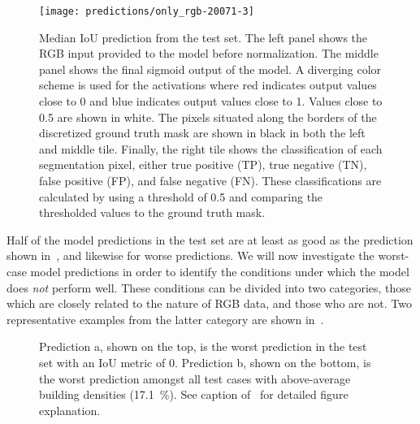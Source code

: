 \begin{figure}[H]
  \centering
  \texttt{[image: predictions/only\_rgb-20071-3]}  %
  \caption{%
    Median IoU prediction from the test set.
    The left panel shows the RGB input provided to the model before normalization.
    The middle panel shows the final sigmoid output of the model.
    A diverging color scheme is used for the activations where red indicates output values close to \num{0} and blue indicates output values close to \num{1}.
    Values close to \num{0.5} are shown in white.
    The pixels situated along the borders of the discretized ground truth mask are shown in black in both the left and middle tile.
    Finally, the right tile shows the classification of each segmentation pixel, either true positive (TP), true negative (TN), false positive (FP), and false negative (FN).
    These classifications are calculated by using a threshold of \num{0.5} and comparing the thresholded values to the ground truth mask.
  }%
  \label{fig:rgb-median-prediction}\label{fig:rgb-explanation}
\end{figure}

Half of the model predictions in the test set are at least as good as the prediction shown in~, and likewise for worse predictions.
We will now investigate the worst-case model predictions in order to identify the conditions under which the model does \emph{not} perform well.
These conditions can be divided into two categories, those which are closely related to the nature of RGB data, and those who are not.
Two representative examples from the latter category are shown in~.

\begin{figure}[H]
  \centering
  \caption{%
    Prediction \thefigure a, shown on the top, is the worst prediction in the test set with an IoU metric of \num{0}.
    Prediction \thefigure b, shown on the bottom, is the worst prediction amongst all test cases with above-average building densities (\SI{17.1}{\percent}).
    See caption of~ for detailed figure explanation.
  }%
  \label{fig:rgb-fundamental-issues}
\end{figure}

